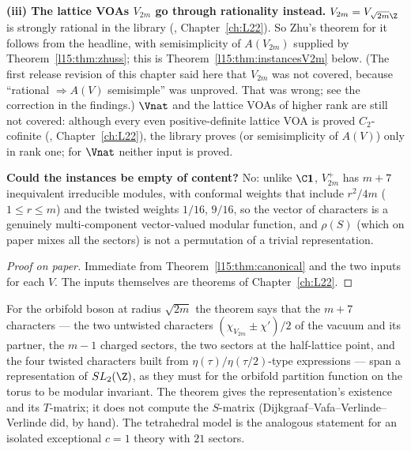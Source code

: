 \begin{dictionary}
\textbf{(iii) The lattice VOAs $V_{2m}$ go through rationality instead.} $V_{2m}=V_{\sqrt{2m}\Z}$ is strongly rational in
the library (, Chapter~\ref{ch:L22}). So Zhu's theorem for it follows from the headline, with
semisimplicity of $A(V_{2m})$ supplied by Theorem~\ref{l15:thm:zhuss}; this is Theorem~\ref{l15:thm:instancesV2m} below.
(The first release revision of this chapter said here that $V_{2m}$ was not covered, because ``rational $\Rightarrow A(V)$
semisimple'' was unproved. That was wrong; see the correction in the findings.) $\Vnat$ and the lattice VOAs of higher rank
are still not covered: although every even positive-definite lattice VOA is proved $C_2$-cofinite
(, Chapter~\ref{ch:L22}), the library proves  (or semisimplicity of
$A(V)$) only in rank one; for $\Vnat$ neither input is proved.

\textbf{Could the instances be empty of content?} No: unlike $\C\lfifteenvac$, $V_{2m}^+$ has $m+7$ inequivalent irreducible
modules, with conformal weights that include $r^2/4m$ ($1\le r\le m$) and the twisted weights $1/16$, $9/16$, so the vector
of characters is a genuinely multi-component vector-valued modular function, and $\rho(S)$ (which on paper mixes all the
sectors) is not a permutation of a trivial representation.
\end{dictionary}

\begin{proof}[Proof on paper]
Immediate from Theorem~\ref{l15:thm:canonical} and the two inputs for each $V$. The inputs themselves are theorems of
Chapter~\ref{ch:L22}.
\end{proof}

\begin{physics}
For the orbifold boson at radius $\sqrt{2m}$ the theorem says that the $m+7$ characters --- the two untwisted characters
$(\chi_{V_{2m}}\pm\chi')/2$ of the vacuum and its partner, the $m-1$ charged sectors, the two sectors at the half-lattice
point, and the four twisted characters built from $\eta(\tau)/\eta(\tau/2)$-type expressions --- span a representation of
$\lfifteenSL$, as they must for the orbifold partition function on the torus to be modular invariant. The theorem gives the
representation's existence and its $T$-matrix; it does not compute the $S$-matrix (Dijkgraaf--Vafa--Verlinde--Verlinde
did, by hand). The tetrahedral model is the analogous statement for an isolated exceptional $c=1$ theory with
$21$ sectors.
\end{physics}

